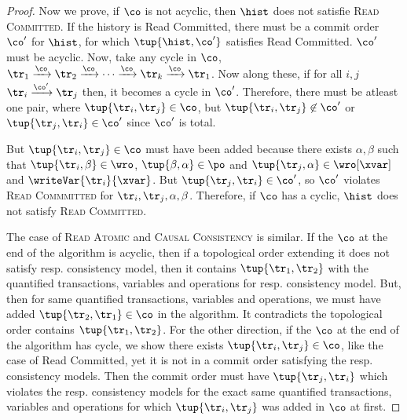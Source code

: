 \begin{proof}
 Now we prove, if $\co$ is not acyclic, then $\hist$ does not satisfie \textsc{Read Committed}. If the history is \textsf{Read Committed}, there must be a commit order $\co'$ for $\hist$, for which $\tup{\hist, \co'}$ satisfies \textsf{Read Committed}. $\co'$ must be acyclic. Now, take any cycle in $\co$, $\tr_1 \xrightarrow{\co} \tr_2 \xrightarrow{\co} \cdots \xrightarrow{\co} \tr_k \xrightarrow{\co} \tr_1$. Now along these, if for all $i, j$ $\tr_i \xrightarrow{\co'} \tr_j$ then, it becomes a cycle in $\co'$. Therefore, there must be atleast one pair, where $\tup{\tr_i, \tr_j} \in \co$, but $\tup{\tr_i, \tr_j} \not\in \co'$ or $\tup{\tr_j, \tr_i} \in \co'$ since $\co'$ is total.
 
 But $\tup{\tr_i, \tr_j} \in \co$ must have been added because there exists $\alpha, \beta$ such that $\tup{\tr_i, \beta} \in \wro$, $\tup{\beta, \alpha} \in \po$ and $\tup{\tr_j, \alpha} \in \wro[\xvar]$ and $\writeVar{\tr_i}{\xvar}$. But $\tup{\tr_j, \tr_i} \in \co'$, so $\co'$ violates \textsc{Read Commmitted} for $\tr_i, \tr_j, \alpha, \beta$. Therefore, if $\co$ has a cyclic, $\hist$ does not satisfy \textsc{Read Committed}.
 
The case of \textsc{Read Atomic} and \textsc{Causal Consistency} is similar. If the $\co$ at the end of the algorithm is acyclic, then if a topological order extending it does not satisfy resp. consistency model, then it contains $\tup{\tr_1, \tr_2}$ with the quantified transactions, variables and operations for resp. consistency model. But, then for same quantified transactions, variables and operations, we must have added $\tup{\tr_2, \tr_1} \in \co$ in the algorithm. It contradicts the topological order contains $\tup{\tr_1, \tr_2}$. For the other direction, if the $\co$ at the end of the algorithm has cycle, we show there exists $\tup{\tr_i, \tr_j} \in \co$, like the case of \textsf{Read Committed}, yet it is not in a commit order satisfying the resp. consistency models. Then the commit order must have $\tup{\tr_j, \tr_i}$ which violates the resp. consistency models for the exact same quantified transactions, variables and operations for which $\tup{\tr_i, \tr_j}$ was added in $\co$ at first.
\end{proof}

